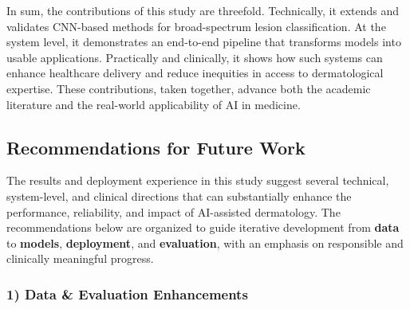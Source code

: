 \documentclass[
  12pt,
  oneside]{article}
\begin{document}
In sum, the contributions of this study are threefold. Technically, it
extends and validates CNN-based methods for broad-spectrum lesion
classification. At the system level, it demonstrates an end-to-end
pipeline that transforms models into usable applications. Practically
and clinically, it shows how such systems can enhance healthcare
delivery and reduce inequities in access to dermatological expertise.
These contributions, taken together, advance both the academic
literature and the real-world applicability of AI in medicine.

\subsection{Recommendations for Future
Work}\label{recommendations-for-future-work}

The results and deployment experience in this study suggest several
technical, system-level, and clinical directions that can substantially
enhance the performance, reliability, and impact of AI-assisted
dermatology. The recommendations below are organized to guide iterative
development from \textbf{data} to \textbf{models}, \textbf{deployment},
and \textbf{evaluation}, with an emphasis on responsible and clinically
meaningful progress.

\subsubsection{1) Data \& Evaluation
Enhancements}\label{data-evaluation-enhancements}
\end{document}
